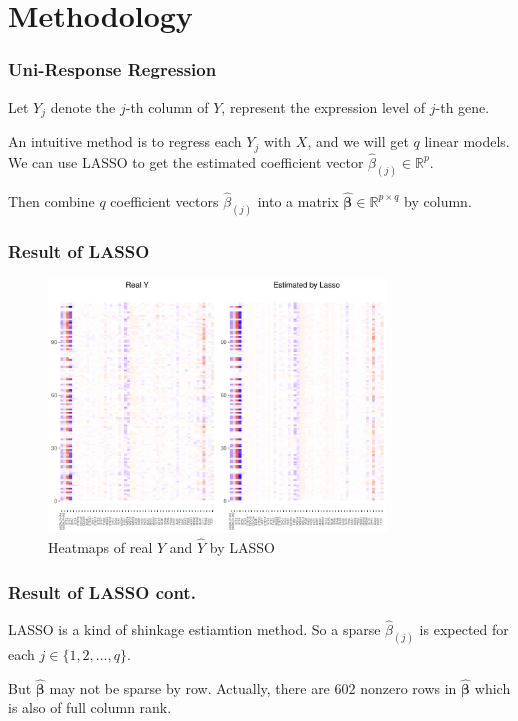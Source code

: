 \section{Methodology}
\begin{frame}
    \sectionpage
\end{frame}

\begin{frame}
    \frametitle{Uni-Response Regression}

    Let $Y_j$ denote the $j$-th column of $Y$, represent the expression level of $j$-th gene. 

    An intuitive method is to regress each $Y_j$ with $X$, and we will get $q$ linear models. 
    We can use LASSO to get the estimated coefficient vector $\hat{\beta}_{(j)}\in\mathbb{R}^{p}$. 
    
    Then combine $q$ coefficient vectors $\hat{\beta}_{(j)}$ into a matrix $\hat{\boldsymbol{\beta}}\in\mathbb{R}^{p\times q}$ by column. 
\end{frame}

\begin{frame}
    \frametitle{Result of LASSO}

    \begin{figure}[h]
        \centering
        \includegraphics[width=0.8\textwidth]{./figs/heatmap_lasso.pdf}
        \caption{Heatmaps of real $Y$ and $\hat{Y}$ by LASSO}
    \end{figure}
\end{frame}

\begin{frame}
    \frametitle{Result of LASSO cont.}
    LASSO is a kind of shinkage estiamtion method. 
    So a sparse $\hat{\beta}_{(j)}$ is expected for each $j\in\{ 1,2,\dots,q \}$. 

    But $\hat{\boldsymbol{\beta}}$ may not be sparse by row. 
    Actually, there are $602$ nonzero rows in $\hat{\boldsymbol{\beta}}$ which is also of full column rank. 
\end{frame}

